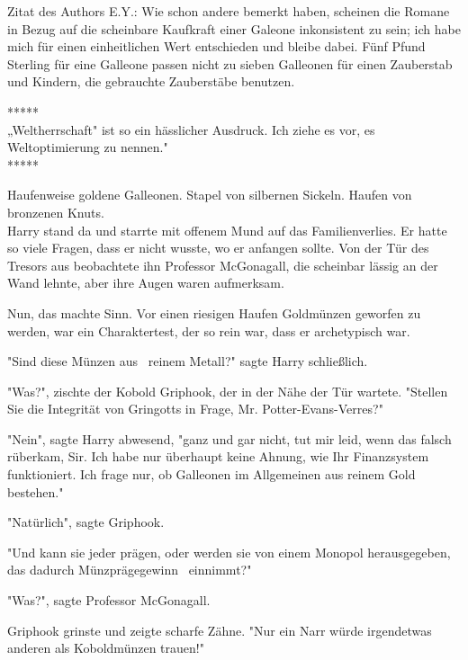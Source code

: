 

\hypertarget{die-hypothese-des-effizienten-marktes}{%

Zitat des Authors E.Y.: Wie schon andere bemerkt haben, scheinen die Romane in Bezug auf die scheinbare Kaufkraft einer Galeone inkonsistent zu sein; ich habe mich für einen einheitlichen Wert entschieden und bleibe dabei. Fünf Pfund Sterling für eine Galleone passen nicht zu sieben Galleonen für einen Zauberstab und Kindern, die gebrauchte Zauberstäbe benutzen. ~

*****\\ „Weltherrschaft" ist so ein hässlicher Ausdruck. Ich ziehe es vor, es Weltoptimierung zu nennen." ~\\ *****

Haufenweise goldene Galleonen. Stapel von silbernen Sickeln. Haufen von bronzenen Knuts.\\ Harry stand da und starrte mit offenem Mund auf das Familienverlies. Er hatte so viele Fragen, dass er nicht wusste, wo er anfangen sollte. Von der Tür des Tresors aus beobachtete ihn Professor McGonagall, die scheinbar lässig an der Wand lehnte, aber ihre Augen waren aufmerksam.

Nun, das machte Sinn. Vor einen riesigen Haufen Goldmünzen geworfen zu werden, war ein Charaktertest, der so rein war, dass er archetypisch war.

"Sind diese Münzen aus ~reinem Metall?" sagte Harry schließlich.

"Was?", zischte der Kobold Griphook, der in der Nähe der Tür wartete. "Stellen Sie die Integrität von Gringotts in Frage, Mr. Potter-Evans-Verres?"

"Nein", sagte Harry abwesend, "ganz und gar nicht, tut mir leid, wenn das falsch rüberkam, Sir. Ich habe nur überhaupt keine Ahnung, wie Ihr Finanzsystem funktioniert. Ich frage nur, ob Galleonen im Allgemeinen aus reinem Gold bestehen."

"Natürlich", sagte Griphook.

"Und kann sie jeder prägen, oder werden sie von einem Monopol herausgegeben, das dadurch Münzprägegewinn ~einnimmt?"

"Was?", sagte Professor McGonagall.

Griphook grinste und zeigte scharfe Zähne. "Nur ein Narr würde irgendetwas anderen als Koboldmünzen trauen!"

}
